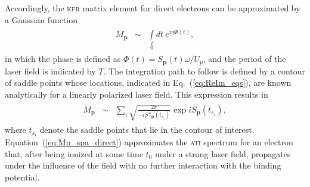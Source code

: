 Accordingly, the \textsc{kfr} matrix element for direct electrons can
be approximated by a Gaussian function~\cite{phd_Kopold}
%
\begin{eqnarray}
  \label{eq:KFR_Mp}
  \begin{split}
    M_{\mathbf{p}} & \sim & \int\limits_{0}\limits^{T} dt\ e^{i \eta \Phi(t)},
  \end{split}
\end{eqnarray}
%
in which the phase is defined as $\Phi(t) = S_{\mathbf{p}}(t)\omega /
U_{p}$, and the period of the laser field is indicated by $T$. The
integration path to follow is defined by a contour of saddle points
whose locations, indicated in Eq.~(\ref{eq:ReIm_eqs}), are known
analytically for a linearly polarized laser field. This expression
results in~\cite{phd_Kopold}
%
\begin{eqnarray}
  \label{eq:Mp_spa_direct}
  \begin{split}
    M_{\mathbf{p}} & \sim & \sum\limits_{i}
    \sqrt{\frac{2\pi}{-i S''_{\mathbf{p}}(t_{s_{i}})}}
    \exp iS_{\mathbf{p}}(t_{s_{i}}),
  \end{split}
\end{eqnarray}
%
where $t_{s_{i}}$ denote the saddle points that lie in the contour of
interest. Equation~(\ref{eq:Mp_spa_direct}) approximates the
\textsc{ati} spectrum for an electron that, after being ionized at
some time $t_{0}$ under a strong laser field, propagates under the
influence of the field with no further interaction with the binding
potential.


